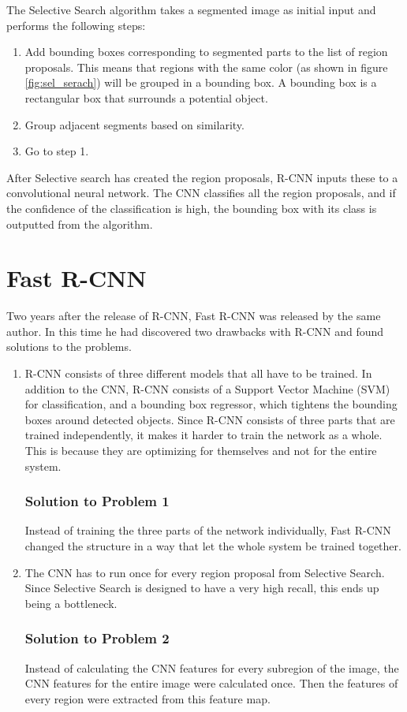 The Selective Search algorithm takes a segmented image as initial input and performs the following steps:
\begin{enumerate}
  \item Add bounding boxes corresponding to segmented parts to the list of region proposals. This means that regions with the same color (as shown in figure \ref{fig:sel_serach}) will be grouped in a bounding box. A bounding box is a rectangular box that surrounds a potential object.
  \item Group adjacent segments based on similarity.
  \item Go to step 1.
\end{enumerate}


After Selective search has created the region proposals, R-CNN inputs these to a convolutional neural network. The CNN classifies all the region proposals, and if the confidence of the classification is high, the bounding box with its class is outputted from the algorithm. 


\section{Fast R-CNN}

Two years after the release of R-CNN, Fast R-CNN  \citep{FastR-CNN} was released by the same author. In this time he had discovered two drawbacks with R-CNN and found solutions to the problems. 

\begin{enumerate}
    \item R-CNN consists of three different models that all have to be trained. In addition to the CNN, R-CNN consists of a Support Vector Machine (SVM) for classification, and a bounding box regressor, which tightens the bounding boxes around detected objects. Since R-CNN consists of three parts that are trained independently, it makes it harder to train the network as a whole. This is because they are optimizing for themselves and not for the entire system. 
    \subsubsection{Solution to Problem 1}
Instead of training the three parts of the network individually, Fast R-CNN changed the structure in a way that let the whole system be trained together.
     
    \item The CNN has to run once for every region proposal from Selective Search. Since Selective Search is designed to have a very high recall, this ends up being a bottleneck. 
    \subsubsection{Solution to Problem 2}
Instead of calculating the CNN features for every subregion of the image, the CNN features for the entire image were calculated once. Then the features of every region were extracted from this feature map.
\end{enumerate}







